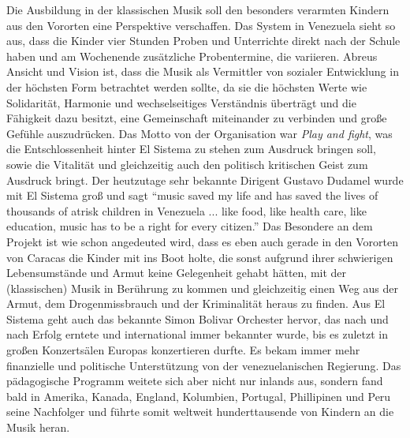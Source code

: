 Die Ausbildung in der klassischen Musik soll den besonders verarmten Kindern aus
den Vororten eine Perspektive verschaffen. Das System in Venezuela sieht so aus,
dass die Kinder vier Stunden Proben und Unterrichte direkt nach der Schule haben
und am Wochenende zusätzliche Probentermine, die variieren. Abreus Ansicht und
Vision ist, dass die Musik als Vermittler von sozialer Entwicklung in der
höchsten Form betrachtet werden sollte, da sie die höchsten Werte wie
Solidarität, Harmonie und wechselseitiges Verständnis überträgt und die
Fähigkeit dazu besitzt, eine Gemeinschaft miteinander zu verbinden und große
Gefühle auszudrücken. Das Motto von der Organisation war \emph{Play and fight},
was die Entschlossenheit hinter El Sistema zu stehen zum Ausdruck bringen soll,
sowie die Vitalität und gleichzeitig auch den politisch kritischen Geist zum
Ausdruck bringt. Der heutzutage sehr bekannte Dirigent Gustavo Dudamel wurde mit
El Sistema groß und sagt \enquote{music saved my life and has saved the lives of
thousands of atrisk children in Venezuela ... like food, like health care, like
education, music has to be a right for every
citizen.}\autocite{wikipedia:el_sistema} Das Besondere an dem Projekt ist wie
schon angedeuted wird, dass es eben auch gerade in den Vororten von Caracas die
Kinder mit ins Boot holte, die sonst aufgrund ihrer schwierigen Lebensumstände
und Armut keine Gelegenheit gehabt hätten, mit der (klassischen) Musik in
Berührung zu kommen und gleichzeitig einen Weg aus der Armut, dem
Drogenmissbrauch und der Kriminalität heraus zu finden. Aus El Sistema geht auch
das bekannte Simon Bolivar Orchester hervor, das nach und nach Erfolg erntete
und international immer bekannter wurde, bis es zuletzt in großen Konzertsälen
Europas konzertieren durfte. Es bekam immer mehr finanzielle und politische
Unterstützung von der venezuelanischen Regierung. Das pädagogische Programm
weitete sich aber nicht nur inlands aus, sondern fand bald in Amerika, Kanada,
England, Kolumbien, Portugal, Phillipinen und Peru seine Nachfolger und führte
somit weltweit hunderttausende von Kindern an die Musik heran. 

